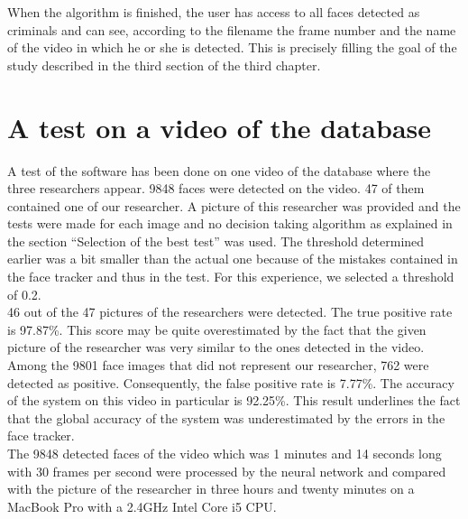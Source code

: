 When the algorithm is finished, the user has access to all faces detected as criminals and can see, according to the filename the frame number and the name of the video in which he or she is detected. This is precisely filling the goal of the study described in the third section of the third chapter.

\section{A test on a video of the database}

A test of the software has been done on one video of the database where the three researchers appear.
9848 faces were detected on the video. 47 of them contained one of our researcher. A picture of this researcher was provided and the tests were made for each image and no decision taking algorithm as explained in the section \enquote{Selection of the best test} was used. The threshold determined earlier was a bit smaller than the actual one because of the mistakes contained in the face tracker and thus in the test. For this experience, we selected a threshold of 0.2.\\
46 out of the 47 pictures of the researchers were detected. The true positive rate is 97.87\%. This score may be quite overestimated by the fact that the given picture of the researcher was very similar to the ones detected in the video. Among the 9801 face images that did not represent our researcher, 762 were detected as positive. Consequently, the false positive rate is 7.77\%. The accuracy of the system on this video in particular is 92.25\%. This result underlines the fact that the global accuracy of the system was underestimated by the errors in the face tracker.\\
The 9848 detected faces of the video which was 1 minutes and 14 seconds long with 30 frames per second were processed by the neural network and compared with the picture of the researcher in three hours and twenty minutes on a MacBook Pro with a 2.4GHz Intel Core i5 CPU.